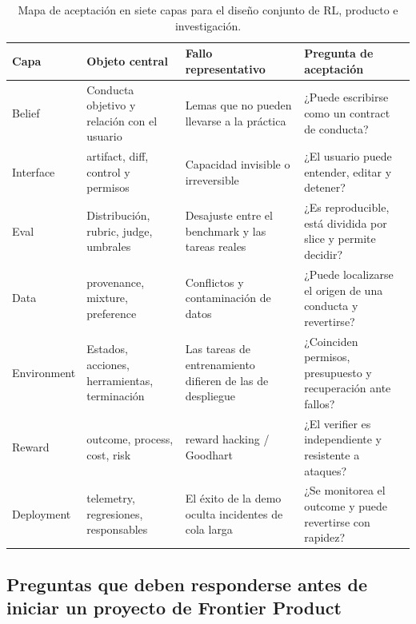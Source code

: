 \documentclass[a4paper]{article}
\begin{document}
\begin{table}[H]
\centering
\small
\begin{tabular}{@{}L{0.16\textwidth}L{0.24\textwidth}L{0.27\textwidth}L{0.23\textwidth}@{}}
\toprule
Capa & Objeto central & Fallo representativo & Pregunta de aceptación \\
\midrule
Belief & Conducta objetivo y relación con el usuario & Lemas que no pueden llevarse a la práctica & ¿Puede escribirse como un contract de conducta? \\
Interface & artifact, diff, control y permisos & Capacidad invisible o irreversible & ¿El usuario puede entender, editar y detener? \\
Eval & Distribución, rubric, judge, umbrales & Desajuste entre el benchmark y las tareas reales & ¿Es reproducible, está dividida por slice y permite decidir? \\
Data & provenance, mixture, preference & Conflictos y contaminación de datos & ¿Puede localizarse el origen de una conducta y revertirse? \\
Environment & Estados, acciones, herramientas, terminación & Las tareas de entrenamiento difieren de las de despliegue & ¿Coinciden permisos, presupuesto y recuperación ante fallos? \\
Reward & outcome, process, cost, risk & reward hacking / Goodhart & ¿El verifier es independiente y resistente a ataques? \\
Deployment & telemetry, regresiones, responsables & El éxito de la demo oculta incidentes de cola larga & ¿Se monitorea el outcome y puede revertirse con rapidez? \\
\bottomrule
\end{tabular}
\caption{Mapa de aceptación en siete capas para el diseño conjunto de RL, producto e investigación.}
\end{table}

\subsection{Preguntas que deben responderse antes de iniciar un proyecto de Frontier Product}
\end{document}
